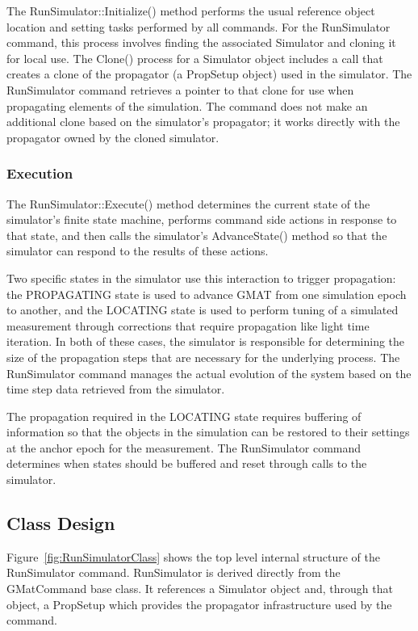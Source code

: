 The RunSimulator::Initialize() method performs the usual reference object location and setting tasks
performed by all commands.  For the RunSimulator command, this process involves finding the associated Simulator and cloning it for local use.  The Clone() process for a Simulator object includes a call that creates a clone of the propagator (a PropSetup object) used in the simulator.  The RunSimulator command retrieves a pointer to that clone for use when propagating elements of the simulation.  The command does not make an additional clone based on the simulator's propagator; it works directly with the propagator owned by the cloned simulator.

\subsubsection{Execution}

The RunSimulator::Execute() method determines the current state of the simulator's finite state machine, performs command side actions in response to that state, and then calls the simulator's AdvanceState() method so that the simulator can respond to the results of these actions.

Two specific states in the simulator use this interaction to trigger propagation: the PROPAGATING state is used to advance GMAT from one simulation epoch to another, and the LOCATING state is used to perform tuning of a simulated measurement through corrections that require propagation like light time iteration.  In both of these cases, the simulator is responsible for determining the size of the propagation steps that are necessary for the underlying process.  The RunSimulator command manages the actual evolution of the system based on the time step data retrieved from the simulator.

The propagation required in the LOCATING state requires buffering of information so that the objects in the simulation can be restored to their settings at the anchor epoch for the measurement.  The RunSimulator command determines when states should be buffered and reset through calls to the simulator.

\subsection{Class Design}

Figure~\ref{fig:RunSimulatorClass} shows the top level internal structure of the RunSimulator command.  RunSimulator is derived directly from the GMatCommand base class.  It references a Simulator object and, through that object, a PropSetup which provides the propagator infrastructure used by the command.


